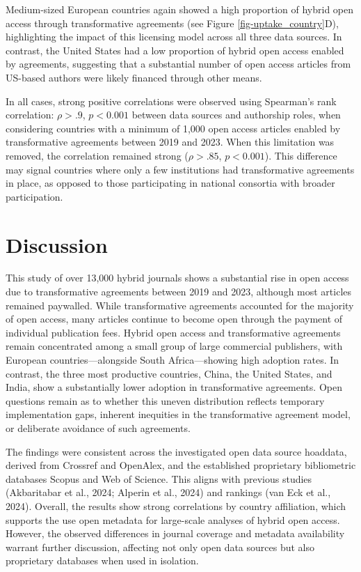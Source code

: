 \documentclass[a4paper,man,floatsintext,longtable,noextraspace,10pt]{apa6}
\begin{document}
Medium-sized European countries again showed a high proportion of hybrid
open access through transformative agreements (see Figure
\ref{fig-uptake_country}D), highlighting the impact of this licensing
model across all three data sources. In contrast, the United States had
a low proportion of hybrid open access enabled by agreements, suggesting
that a substantial number of open access articles from US-based authors
were likely financed through other means.

In all cases, strong positive correlations were observed using
Spearman's rank correlation: \(\rho > .9\), \(p < 0.001\) between data
sources and authorship roles, when considering countries with a minimum
of 1,000 open access articles enabled by transformative agreements
between 2019 and 2023. When this limitation was removed, the correlation
remained strong (\(\rho > .85\), \(p < 0.001\)). This difference may
signal countries where only a few institutions had transformative
agreements in place, as opposed to those participating in national
consortia with broader participation.

\section{Discussion}\label{discussion}

This study of over 13,000 hybrid journals shows a substantial rise in
open access due to transformative agreements between 2019 and 2023,
although most articles remained paywalled. While transformative
agreements accounted for the majority of open access, many articles
continue to become open through the payment of individual publication
fees. Hybrid open access and transformative agreements remain
concentrated among a small group of large commercial publishers, with
European countries---alongside South Africa---showing high adoption
rates. In contrast, the three most productive countries, China, the
United States, and India, show a substantially lower adoption in
transformative agreements. Open questions remain as to whether this
uneven distribution reflects temporary implementation gaps, inherent
inequities in the transformative agreement model, or deliberate
avoidance of such agreements.

The findings were consistent across the investigated open data source
hoaddata, derived from Crossref and OpenAlex, and the established
proprietary bibliometric databases Scopus and Web of Science. This
aligns with previous studies (Akbaritabar et al., 2024; Alperin et al.,
2024) and rankings (van Eck et al., 2024). Overall, the results show
strong correlations by country affiliation, which supports the use open
metadata for large-scale analyses of hybrid open access. However, the
observed differences in journal coverage and metadata availability
warrant further discussion, affecting not only open data sources but
also proprietary databases when used in isolation.
\end{document}
